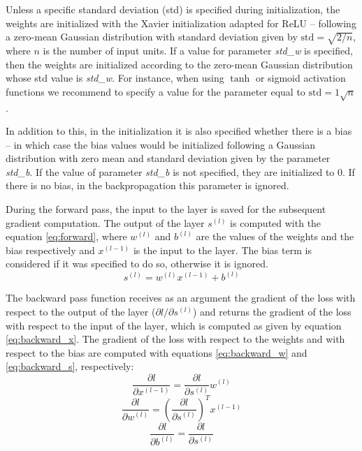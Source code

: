 \documentclass[10pt,conference,compsocconf]{IEEEtran}
\begin{document}
        Unless a specific standard deviation (std) is specified during initialization, the weights are initialized with the Xavier \cite{Glorot10understandingthe} initialization adapted for ReLU \cite{DBLP:journals/corr/HeZR015} -- following a zero-mean Gaussian distribution with standard deviation given by $\text{std} = \sqrt{2/n}$,
        where $n$ is the number of input units.
        If a value for parameter \textit{std\_w} is specified, then the weights are initialized according to the zero-mean Gaussian distribution whose std value is \textit{std\_w}. For instance, when using $\tanh$ or sigmoid activation functions we recommend to specify a value for the parameter equal to $\text{std} = 1\sqrt{n}$.
  	
        In addition to this, in the initialization it is also specified whether there is a bias -- in which case the bias values would be initialized following a Gaussian distribution with zero mean and standard deviation given by the parameter \textit{std\_b}. If the value of parameter \textit{std\_b} is not specified, they are initialized to 0. If there is no bias, in the backpropagation this parameter is ignored.
  	
        During the forward pass, the input to the layer is saved for the subsequent gradient computation. The output of the layer $s^{(l)}$ is computed with the equation \ref{eq:forward}, where $w^{(l)}$ and $b^{(l)}$ are the values of the weights and the bias respectively and $x^{(l-1)}$ is the input to the layer. The bias term is considered if it was specified to do so, otherwise it is ignored.
        \begin{equation}
      	    \label{eq:forward}
            s^{(l)} = w^{(l)}x^{(l-1)} + b^{(l)} 
        \end{equation}
     
        The backward pass function receives as an argument the gradient of the loss with respect to the output of the layer ($\partial l/\partial s^{(l)}$) and returns the gradient of the loss with respect to the input of the layer, which is computed as given by equation \ref{eq:backward_x}. The gradient of the loss with respect to the weights and with respect to the bias are computed with equations \ref{eq:backward_w} and \ref{eq:backward_s}, respectively:
         \begin{equation}
      	    \label{eq:backward_x}
            \frac{\partial l}{\partial x^{(l-1)}} =\frac{\partial l}{\partial s^{(l)}}  w^{(l)}
         \end{equation}
         \begin{equation}
      	    \label{eq:backward_w}
            \frac{\partial l}{\partial w^{(l)}} =\left(\frac{\partial l}{\partial s^{(l)}}\right)^T x^{(l-1)}
         \end{equation}
         \begin{equation}
      	    \label{eq:backward_s}
            \frac{\partial l}{\partial b^{(l)}} =\frac{\partial l}{\partial s^{(l)}}
         \end{equation}
     
\end{document}
